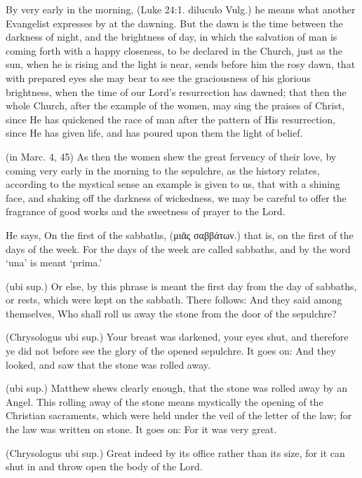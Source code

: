  By very early in the morning, (Luke 24:1. diluculo Vulg.) he means what another Evangelist expresses by at the dawning. But the dawn is the time between the darkness of night, and the brightness of day, in which the salvation of man is coming forth with a happy closeness, to be declared in the Church, just as the sun, when he is rising and the light is near, sends before him the rosy dawn, that with prepared eyes she may bear to see the graciousness of his glorious brightness, when the time of our Lord’s resurrection has dawned; that then the whole Church, after the example of the women, may sing the praises of Christ, since He has quickened the race of man after the pattern of His resurrection, since He has given life, and has poured upon them the light of belief.

 (in Marc. 4, 45) As then the women shew the great fervency of their love, by coming very early in the morning to the sepulchre, as the history relates, according to the mystical sense an example is given to us, that with a shining face, and shaking off the darkness of wickedness, we may be careful to offer the fragrance of good works and the sweetness of prayer to the Lord.

 He says, On the first of the sabbaths, (\textgreek{μιᾱς σαββάτων}.) that is, on the first of the days of the week. For the days of the week are called sabbaths, and by the word ‘una’ is meant ‘prima.’

 (ubi sup.) Or else, by this phrase is meant the first day from the day of sabbaths, or rests, which were kept on the sabbath. There follows: And they said among themselves, Who shall roll us away the stone from the door of the sepulchre?

 (Chrysologus ubi sup.) Your breast was darkened, your eyes shut, and therefore ye did not before see the glory of the opened sepulchre. It goes on: And they looked, and saw that the stone was rolled away.

 (ubi sup.) Matthew shews clearly enough, that the stone was rolled away by an Angel. This rolling away of the stone means mystically the opening of the Christian sacraments, which were held under the veil of the letter of the law; for the law was written on stone. It goes on: For it was very great.

 (Chrysologus ubi sup.) Great indeed by its office rather than its size, for it can shut in and throw open the body of the Lord.

